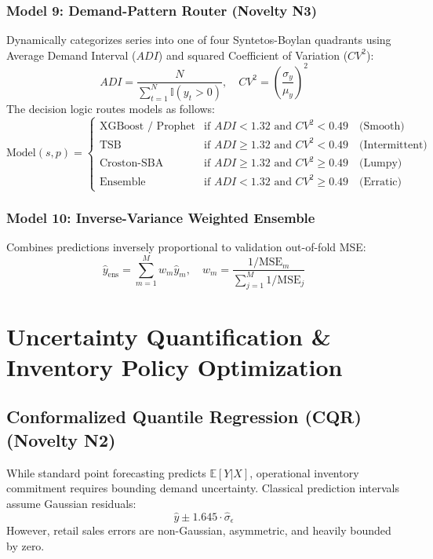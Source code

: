 \documentclass[12pt,a4paper,oneside]{report}
\theoremstyle{definition}
\begin{document}
\subsection{Model 9: Demand-Pattern Router (Novelty N3)}
Dynamically categorizes series into one of four Syntetos-Boylan quadrants using Average Demand Interval ($ADI$) and squared Coefficient of Variation ($CV^2$):
\begin{equation}
ADI = \frac{N}{\sum_{t=1}^N \mathbb{I}(y_t > 0)}, \quad CV^2 = \left(\frac{\sigma_y}{\mu_y}\right)^2
\end{equation}
The decision logic routes models as follows:
\begin{equation}
\text{Model}(s, p) = \begin{cases}
\text{XGBoost / Prophet} & \text{if } ADI < 1.32 \text{ and } CV^2 < 0.49 \quad \text{(Smooth)} \\
\text{TSB} & \text{if } ADI \ge 1.32 \text{ and } CV^2 < 0.49 \quad \text{(Intermittent)} \\
\text{Croston-SBA} & \text{if } ADI \ge 1.32 \text{ and } CV^2 \ge 0.49 \quad \text{(Lumpy)} \\
\text{Ensemble} & \text{if } ADI < 1.32 \text{ and } CV^2 \ge 0.49 \quad \text{(Erratic)}
\end{cases}
\end{equation}

\subsection{Model 10: Inverse-Variance Weighted Ensemble}
Combines predictions inversely proportional to validation out-of-fold MSE:
\begin{equation}
\hat{y}_{\text{ens}} = \sum_{m=1}^M w_m \hat{y}_m, \quad w_m = \frac{1/\text{MSE}_m}{\sum_{j=1}^M 1/\text{MSE}_j}
\end{equation}

\newpage
\chapter{Uncertainty Quantification \& Inventory Policy Optimization}

\section{Conformalized Quantile Regression (CQR) (Novelty N2)}
While standard point forecasting predicts $\mathbb{E}[Y|X]$, operational inventory commitment requires bounding demand uncertainty. Classical prediction intervals assume Gaussian residuals:
\begin{equation}
\hat{y} \pm 1.645 \cdot \hat{\sigma}_{\epsilon}
\end{equation}
However, retail sales errors are non-Gaussian, asymmetric, and heavily bounded by zero.
\end{document}

